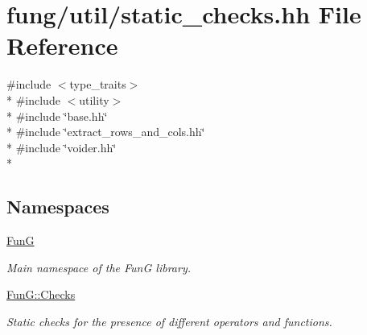 \hypertarget{static__checks_8hh}{}\section{fung/util/static\+\_\+checks.hh File Reference}
\label{static__checks_8hh}
{\ttfamily \#include $<$type\+\_\+traits$>$}\\*
{\ttfamily \#include $<$utility$>$}\\*
{\ttfamily \#include \char`\"{}base.\+hh\char`\"{}}\\*
{\ttfamily \#include \char`\"{}extract\+\_\+rows\+\_\+and\+\_\+cols.\+hh\char`\"{}}\\*
{\ttfamily \#include \char`\"{}voider.\+hh\char`\"{}}\\*
\subsection*{Namespaces}
\begin{DoxyCompactItemize}
\item 
 \hyperlink{namespaceFunG}{Fun\+G}
\begin{DoxyCompactList}\small\item\em Main namespace of the Fun\+G library. \end{DoxyCompactList}\item 
 \hyperlink{namespaceFunG_1_1Checks}{Fun\+G\+::\+Checks}
\begin{DoxyCompactList}\small\item\em Static checks for the presence of different operators and functions. \end{DoxyCompactList}\end{DoxyCompactItemize}
